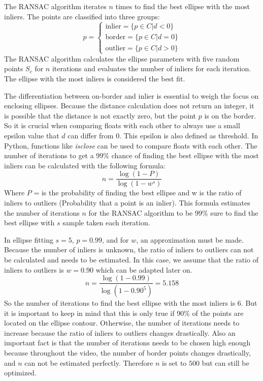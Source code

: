 The RANSAC algorithm iterates $n$ times to find the best ellipse with the most inliers. The points are classified into three groups: 
\begin{equation}
    p =\begin{cases}
    \text{inlier} = \{p \in C | d < 0\}\\
    \text{border} = \{p \in C | d = 0\}\\
    \text{outlier} = \{p \in C | d > 0\}
    \end{cases}
    \label{inliers}
\end{equation}
The RANSAC algorithm calculates the ellipse parameters with five random points $S_c$ for $n$ iterations and evaluates the number of inliers for each iteration. The ellipse with the most inliers is considered the best fit. 

The differentiation between on-border and inlier is essential to weigh the focus on enclosing ellipses. Because the distance calculation does not return an integer, it is possible that the distance is not exactly zero, but the point $p$ is on the border. So it is crucial when comparing floats with each other to always use a small epsilon value that $d$ can differ from 0. This epsilon is also defined as threshold. 
In Python, functions like \textit{isclose} can be used to compare floats with each other. The number of iterations to get a 99\% chance of finding the best ellipse with the most inliers can be calculated with the following formula: 
\begin{equation}
    n = \frac{\log(1-P)}{\log(1-w^s)}
    \label{iterations}
\end{equation}
Where $P$ = is the probability of finding the best ellipse and w is the ratio of inliers to outliers (Probability that a point is an inlier). This formula estimates the number of iterations $n$ for the RANSAC algorithm to be 99\% sure to find the best ellipse with $s$ sample taken each iteration. 

In ellipse fitting $s=5$, $p=0.99$, and for $w$, an approximation must be made. Because the number of inliers is unknown, the ratio of inliers to outliers can not be calculated and needs to be estimated. In this case, we assume that the ratio of inliers to outliers is $w=0.90$ which can be adapted later on. 
\begin{equation}
    n = \frac{\log(1-0.99)}{\log(1-0.90^5)} =  5.158
\end{equation}
So the number of iterations to find the best ellipse with the most inliers is 6. But it is important to keep in mind that this is only true if 90\% of the points are located on the ellipse contour. Otherwise, the number of iterations needs to increase because the ratio of inliers to outliers changes drastically. Also an important fact is that the number of iterations needs to be chosen high enough because throughout the video, the number of border points changes drastically, and $n$ can not be estimated perfectly. Therefore $n$ is set to $500$ but can still be optimized.

